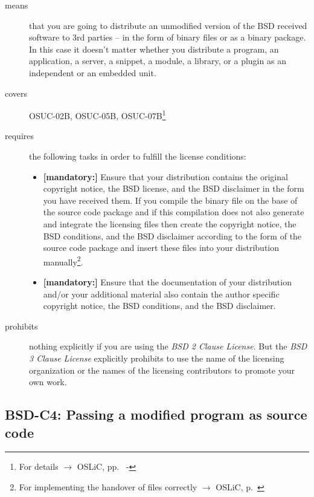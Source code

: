 \begin{description}
\item[means] that you are going to distribute an unmodified version of the BSD
received software to 3rd parties -- in the form of binary files or as a bi\-na\-ry
package. In this case it doesn't matter whether you distribute a
program, an application, a server, a snippet, a module, a library, or a plugin
as an independent or an embedded unit.
\item[covers] OSUC-02B, OSUC-05B, OSUC-07B\footnote{For details $\rightarrow$
OSLiC, pp.\ \pageref{OSUC-02B-DEF} - \pageref{OSUC-07B-DEF}}
\item[requires] the following tasks in order to fulfill the license conditions:
\begin{itemize}
  
  \item  \textbf{[mandatory:]} Ensure that your distribution contains the
  original copyright notice, the BSD license, and the BSD disclaimer in the form
  you have received them. If you compile the binary file on the base of the
  source code package and if this compilation does not also generate and
  integrate the licensing files then create the copyright notice, the BSD
  conditions, and the BSD disclaimer according to the form of the source code
  package and insert these files into your distribution manually\footnote{For
  implementing the handover of files correctly $\rightarrow$ OSLiC, p.\ 
  \pageref{DistributingFilesHint}}.
  
  \item  \textbf{[mandatory:]} Ensure that the documentation of your
  distribution and/or your additional material also contain the author specific
  copyright notice, the BSD conditions, and the BSD disclaimer.
\end{itemize}

\item[prohibits] nothing explicitly if you are using the \emph{BSD 2 Clause
License}. But the \emph{BSD 3 Clause License} explicitly prohibits to use the
name of the licensing organization or the names of the licensing contributors to
promote your own work.

\end{description}

\subsection{BSD-C4: Passing a modified program as source code}
\label{OSUC-04S-BSD}

